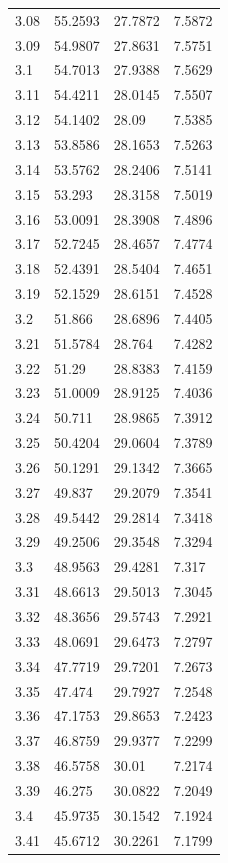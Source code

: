\begin{tabular}{llll}
3.08 & 55.2593 & 27.7872 & 7.5872 \\
3.09 & 54.9807 & 27.8631 & 7.5751 \\
3.1 & 54.7013 & 27.9388 & 7.5629 \\
3.11 & 54.4211 & 28.0145 & 7.5507 \\
3.12 & 54.1402 & 28.09 & 7.5385 \\
3.13 & 53.8586 & 28.1653 & 7.5263 \\
3.14 & 53.5762 & 28.2406 & 7.5141 \\
3.15 & 53.293 & 28.3158 & 7.5019 \\
3.16 & 53.0091 & 28.3908 & 7.4896 \\
3.17 & 52.7245 & 28.4657 & 7.4774 \\
3.18 & 52.4391 & 28.5404 & 7.4651 \\
3.19 & 52.1529 & 28.6151 & 7.4528 \\
3.2 & 51.866 & 28.6896 & 7.4405 \\
3.21 & 51.5784 & 28.764 & 7.4282 \\
3.22 & 51.29 & 28.8383 & 7.4159 \\
3.23 & 51.0009 & 28.9125 & 7.4036 \\
3.24 & 50.711 & 28.9865 & 7.3912 \\
3.25 & 50.4204 & 29.0604 & 7.3789 \\
3.26 & 50.1291 & 29.1342 & 7.3665 \\
3.27 & 49.837 & 29.2079 & 7.3541 \\
3.28 & 49.5442 & 29.2814 & 7.3418 \\
3.29 & 49.2506 & 29.3548 & 7.3294 \\
3.3 & 48.9563 & 29.4281 & 7.317 \\
3.31 & 48.6613 & 29.5013 & 7.3045 \\
3.32 & 48.3656 & 29.5743 & 7.2921 \\
3.33 & 48.0691 & 29.6473 & 7.2797 \\
3.34 & 47.7719 & 29.7201 & 7.2673 \\
3.35 & 47.474 & 29.7927 & 7.2548 \\
3.36 & 47.1753 & 29.8653 & 7.2423 \\
3.37 & 46.8759 & 29.9377 & 7.2299 \\
3.38 & 46.5758 & 30.01 & 7.2174 \\
3.39 & 46.275 & 30.0822 & 7.2049 \\
3.4 & 45.9735 & 30.1542 & 7.1924 \\
3.41 & 45.6712 & 30.2261 & 7.1799 \\

\end{tabular}
